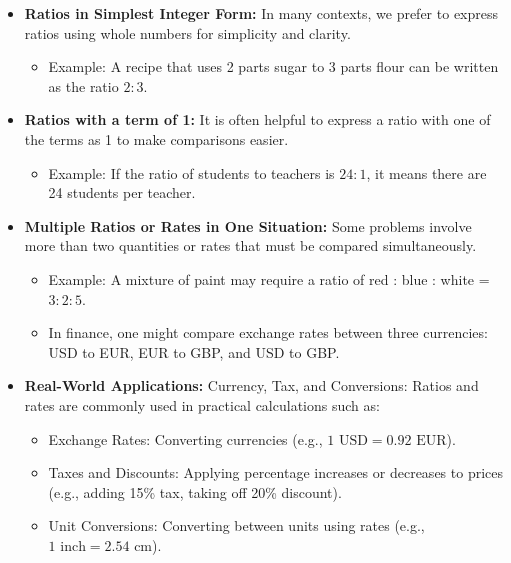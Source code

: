 \documentclass[
]{book}
\providecommand{\tightlist}{%
  \setlength{\itemsep}{0pt}\setlength{\parskip}{0pt}}
\begin{document}
\begin{enumerate}
  \begin{itemize}
  \tightlist
  \item
    \textbf{Ratios in Simplest Integer Form:} In many contexts, we prefer to express ratios using whole numbers for simplicity and clarity.

    \begin{itemize}
    \tightlist
    \item
      Example: A recipe that uses 2 parts sugar to 3 parts flour can be written as the ratio \(2:3\).
    \end{itemize}
  \item
    \textbf{Ratios with a term of 1:} It is often helpful to express a ratio with one of the terms as 1 to make comparisons easier.

    \begin{itemize}
    \tightlist
    \item
      Example: If the ratio of students to teachers is \(24:1\), it means there are 24 students per teacher.
    \end{itemize}
  \item
    \textbf{Multiple Ratios or Rates in One Situation:} Some problems involve more than two quantities or rates that must be compared simultaneously.

    \begin{itemize}
    \tightlist
    \item
      Example: A mixture of paint may require a ratio of red : blue : white = \(3:2:5\).\\
    \item
      In finance, one might compare exchange rates between three currencies: USD to EUR, EUR to GBP, and USD to GBP.
    \end{itemize}
  \item
    \textbf{Real-World Applications:} Currency, Tax, and Conversions: Ratios and rates are commonly used in practical calculations such as:

    \begin{itemize}
    \tightlist
    \item
      Exchange Rates: Converting currencies (e.g., \(1 \text{ USD} = 0.92 \text{ EUR}\)).
    \item
      Taxes and Discounts: Applying percentage increases or decreases to prices (e.g., adding 15\% tax, taking off 20\% discount).
    \item
      Unit Conversions: Converting between units using rates (e.g., \(1 \text{ inch} = 2.54 \text{ cm}\)).
    \end{itemize}
  \end{itemize}
\end{enumerate}
\end{document}

